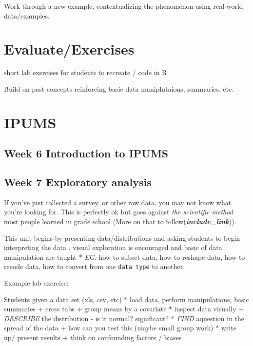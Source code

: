 \documentclass[
]{book}
\begin{document}
Work through a new example, contextualizing the phenomenon using real-world data/examples.

\hypertarget{evaluateexercises-1}{%
\chapter{Evaluate/Exercises}\label{evaluateexercises-1}}

short lab exercises for students to recreate / code in R

Build on past concepts reinforcing basic data maniplutaions, summaries, etc.

\hypertarget{unit2}{%
\chapter{IPUMS}\label{unit2}}

\hypertarget{week-6-introduction-to-ipums}{%
\section{Week 6 Introduction to IPUMS}\label{week-6-introduction-to-ipums}}

\hypertarget{exploratory}{%
\section{Week 7 Exploratory analysis}\label{exploratory}}

If you've just collected a survey, or other raw data, you may not know what you're looking for. This is perfectly ok but goes against \emph{the scientific method} most people learned in grade school (More on that to follow(\textbf{\emph{include\_link}})).

This unit begins by presenting data/distributions and asking students to begin interpreting the data . visual exploration is encouraged and basic of data manipulation are taught
* \emph{EG:} how to subset data, how to reshape data, how to recode data, how to convert from one \texttt{data\ type} to another.

Example lab exercise:

Students given a data set (xls, csv, etc)
* load data, perform manipulations, basic summaries
+ cross tabs
+ group means by a covariate
* inspect data visually
+ \emph{DESCRIBE} the distribution - is it normal? significant?
* \emph{FIND} aquestion in the spread of the data
+ how can you test this (maybe small group work)
* write up/ present results
+ think on confounding factors / biases
\end{document}
